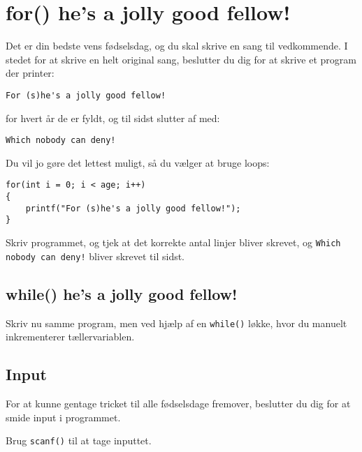 \documentclass[hidelinks]{article} %
\begin{document}
\section{for() he's a jolly good fellow!}
Det er din bedste vens fødselsdag, og du skal skrive en sang til vedkommende. I stedet for at skrive en helt original sang, beslutter du dig for at skrive et program der printer:
\begin{lstlisting}
For (s)he's a jolly good fellow!
\end{lstlisting}
for hvert år de er fyldt, og til sidst slutter af med:
\begin{lstlisting}
Which nobody can deny!
\end{lstlisting}
Du vil jo gøre det lettest muligt, så du vælger at bruge loops:
\begin{lstlisting}
for(int i = 0; i < age; i++)
{
	printf("For (s)he's a jolly good fellow!");
}
\end{lstlisting}
Skriv programmet, og tjek at det korrekte antal linjer bliver skrevet, og \lstinline{Which nobody can deny!} bliver skrevet til sidst.

\subsection{while() he's a jolly good fellow!}
Skriv nu samme program, men ved hjælp af en \lstinline{while()} løkke, hvor du manuelt inkrementerer tællervariablen.

\subsection{Input}
For at kunne gentage tricket til alle fødselsdage fremover, beslutter du dig for at smide input i programmet.

Brug \lstinline{scanf()} til at tage inputtet.
\end{document}
